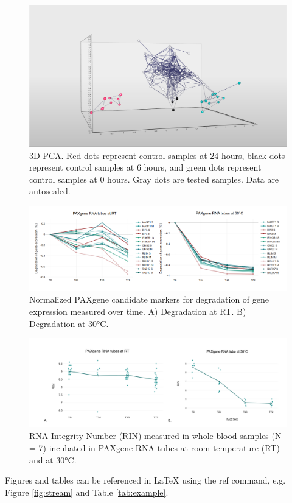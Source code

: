 \documentclass[fleqn,10pt]{wlscirep}
\begin{document}
\begin{figure}[ht]
    \centering
    \includegraphics[width=\linewidth]{figure5}
    \caption{3D PCA. Red dots represent control samples at 24 hours, black dots represent control samples at 6 hours, and green dots represent control samples at 0 hours. Gray dots are tested samples. Data are autoscaled.}
    \label{fig:figure5}
    \end{figure}

\begin{figure}[ht]
    \centering
    \includegraphics[width=\linewidth]{figure6}
    \caption{Normalized PAXgene candidate markers for degradation of gene expression measured over time. A) Degradation at RT. B) Degradation at 30°C.}
    \label{fig:figure6}
    \end{figure}


\begin{figure}[ht]
    \centering
    \includegraphics[width=\linewidth]{fig7}
    \caption{RNA Integrity Number (RIN) measured in whole blood samples (N = 7) incubated in PAXgene RNA tubes at room temperature (RT) and at 30°C.}
    \label{fig:figure7}
    \end{figure}

Figures and tables can be referenced in LaTeX using the ref command, e.g. Figure \ref{fig:stream} and Table \ref{tab:example}.
\end{document}
